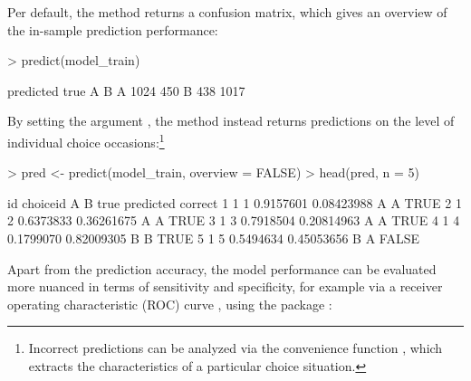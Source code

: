 \documentclass[article]{jss}
\newcommand{\fct}[1]{\code{#1()}}
\begin{document}
Per default, the \fct{predict} method returns a confusion matrix, which gives an overview of the in-sample prediction performance:

\begin{Schunk}
\begin{Sinput}
> predict(model_train)
\end{Sinput}
\begin{Soutput}
    predicted
true    A    B
   A 1024  450
   B  438 1017
\end{Soutput}
\end{Schunk}

By setting the argument , the method instead returns predictions on the level of individual choice occasions:\footnote{Incorrect predictions can be analyzed via the convenience function \fct{get\_cov}, which extracts the characteristics of a particular choice situation.}

\begin{Schunk}
\begin{Sinput}
> pred <- predict(model_train, overview = FALSE)
> head(pred, n = 5)
\end{Sinput}
\begin{Soutput}
  id choiceid         A          B true predicted correct
1  1        1 0.9157601 0.08423988    A         A    TRUE
2  1        2 0.6373833 0.36261675    A         A    TRUE
3  1        3 0.7918504 0.20814963    A         A    TRUE
4  1        4 0.1799070 0.82009305    B         B    TRUE
5  1        5 0.5494634 0.45053656    B         A   FALSE
\end{Soutput}
\end{Schunk}

Apart from the prediction accuracy, the model performance can be evaluated more nuanced in terms of sensitivity and specificity, for example via a receiver operating characteristic (ROC) curve \citep{Fawcett:2006}, using the  package \citep{Sachs:2017}:
\end{document}
